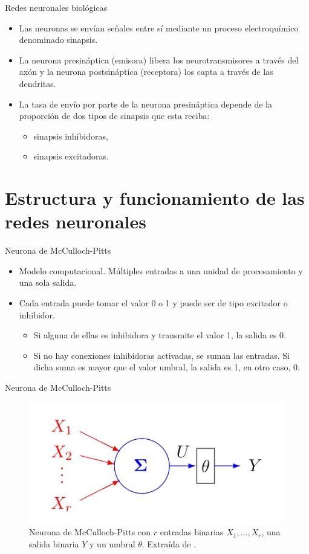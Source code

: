 \documentclass[spanish]{beamer}
\begin{document}
\begin{frame}{Redes neuronales biológicas}
  \begin{itemize}
    \item Las neuronas se envían señales entre sí mediante un proceso electroquímico denominado sinapsis.
    \item La neurona presináptica (emisora) libera los neurotransmisores a través del axón y la neurona postsináptica (receptora) los capta a través de las dendritas.
    \item La tasa de envío por parte de la neurona presináptica depende de la proporción de dos tipos de sinapsis que esta reciba: \begin{itemize}
      \item sinapsis inhibidoras,
      \item sinapsis excitadoras.
    \end{itemize}
  \end{itemize}
\end{frame}

\section{Estructura y funcionamiento de las redes neuronales}

\begin{frame}{Neurona de McCulloch-Pitts}
  \begin{itemize}
    \item Modelo computacional. Múltiples entradas a una unidad de procesamiento y una sola salida.
    \item Cada entrada puede tomar el valor 0 o 1 y puede ser de tipo excitador o inhibidor. \begin{itemize}
      \item Si alguna de ellas es inhibidora y transmite el valor 1, la salida es 0.
      \item Si no hay conexiones inhibidoras activadas, se suman las entradas. Si dicha suma es mayor que el valor umbral, la salida es 1, en otro caso, 0.
    \end{itemize}
  \end{itemize}
\end{frame}

\begin{frame}{Neurona de McCulloch-Pitts}
  \begin{figure}[h]
    \centering
    \includegraphics[width=.7\textwidth]{img/mcculloch-pitts}
    \caption{Neurona de McCulloch-Pitts con $r$ entradas binarias $X_1,\dots,X_r$, una salida binaria $Y$ y un umbral $\theta$. Extraída de \parencite{izenman_modern_2008}.}
    \label{fig:mcculloch-pitts}
  \end{figure}
\end{frame}
\end{document}
